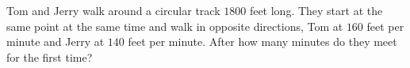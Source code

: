 Tom and Jerry walk around a circular track $1800$ feet long. They start at the same point at the same time and walk in opposite directions, Tom at $160$ feet per minute and Jerry at $140$ feet per minute. After how many minutes do they meet for the first time?
